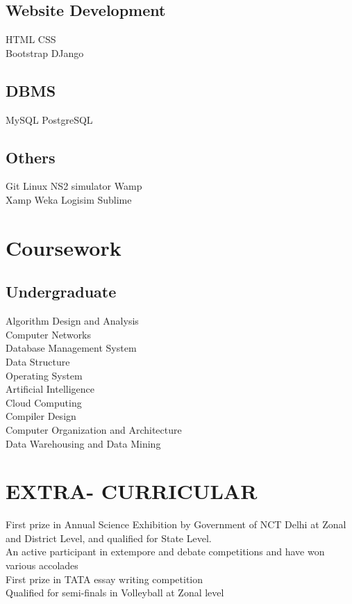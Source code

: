 \documentclass[]{resume-openfont}
\begin{document}
\begin{minipage}[t]{0.31\textwidth}
\subsection{Website Development}
HTML \textbullet{} CSS \\
Bootstrap \textbullet{} DJango
\sectionsep
\subsection{DBMS}
MySQL \textbullet{} PostgreSQL
\sectionsep
\subsection{Others}
Git \textbullet{} Linux \textbullet{} NS2 simulator \textbullet{} Wamp \\ \textbullet{} Xamp \textbullet{} Weka \textbullet{} Logisim \textbullet{} Sublime 
\sectionsep


\section{Coursework}
\subsection{Undergraduate}
Algorithm Design and Analysis \\
Computer Networks \\
Database Management System \\
Data Structure \\
Operating System \\
Artificial Intelligence \\
Cloud Computing \\
Compiler Design \\
Computer Organization and Architecture \\
Data Warehousing and Data Mining 
\sectionsep


\section{EXTRA- CURRICULAR}
\textbullet{} First prize in Annual Science Exhibition by Government of NCT Delhi at Zonal and District Level, and qualified for State Level. \\
\textbullet{} An active participant in extempore and debate competitions and have won various accolades \\
\textbullet{} First prize in TATA essay writing competition \\
\textbullet{} Qualified for semi-finals in Volleyball at Zonal level
\sectionsep


\end{minipage}
\end{document}
